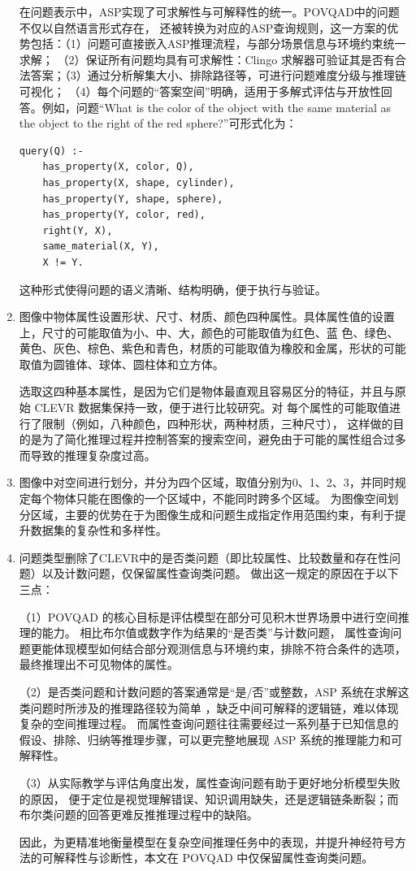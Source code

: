 \begin{enumerate}[nosep]
在问题表示中，ASP实现了可求解性与可解释性的统一。POVQAD中的问题不仅以自然语言形式存在，
还被转换为对应的ASP查询规则，这一方案的优势包括：（1）问题可直接嵌入ASP推理流程，与部分场景信息与环境约束统一求解；
（2）保证所有问题均具有可求解性：Clingo 求解器可验证其是否有合法答案；（3）通过分析解集大小、排除路径等，可进行问题难度分级与推理链可视化；
（4）每个问题的“答案空间”明确，适用于多解式评估与开放性回答。例如，问题“What is the color of the object with the same material as the object to the right of the red sphere?”可形式化为：
\begin{lstlisting}
query(Q) :-
    has_property(X, color, Q),
    has_property(X, shape, cylinder),
    has_property(Y, shape, sphere),
    has_property(Y, color, red),
    right(Y, X),
    same_material(X, Y),
    X != Y.
\end{lstlisting}
这种形式使得问题的语义清晰、结构明确，便于执行与验证。
\item 图像中物体属性设置形状、尺寸、材质、颜色四种属性。具体属性值的设置上，尺寸的可能取值为小、中、大，颜色的可能取值为红色、蓝
色、绿色、黄色、灰色、棕色、紫色和青色，材质的可能取值为橡胶和金属，形状的可能取值为圆锥体、球体、圆柱体和立方体。

选取这四种基本属性，是因为它们是物体最直观且容易区分的特征，并且与原始 CLEVR 数据集保持一致，便于进行比较研究。对
每个属性的可能取值进行了限制（例如，八种颜色，四种形状，两种材质，三种尺寸），
这样做的目的是为了简化推理过程并控制答案的搜索空间，避免由于可能的属性组合过多而导致的推理复杂度过高。
\item 图像中对空间进行划分，并分为四个区域，取值分别为0、1、2、3，并同时规定每个物体只能在图像的一个区域中，不能同时跨多个区域。
为图像空间划分区域，主要的优势在于为图像生成和问题生成指定作用范围约束，有利于提升数据集的复杂性和多样性。
\item 问题类型删除了CLEVR中的是否类问题（即比较属性、比较数量和存在性问题）以及计数问题，仅保留属性查询类问题。
做出这一规定的原因在于以下三点：

（1）POVQAD 的核心目标是评估模型在部分可见积木世界场景中进行空间推理的能力。
相比布尔值或数字作为结果的“是否类”与计数问题，
属性查询问题更能体现模型如何结合部分观测信息与环境约束，排除不符合条件的选项，最终推理出不可见物体的属性。

（2）是否类问题和计数问题的答案通常是“是/否”或整数，ASP 系统在求解这类问题时所涉及的推理路径较为简单
，缺乏中间可解释的逻辑链，难以体现复杂的空间推理过程。
而属性查询问题往往需要经过一系列基于已知信息的假设、排除、归纳等推理步骤，可以更完整地展现 ASP 系统的推理能力和可解释性。

（3）从实际教学与评估角度出发，属性查询问题有助于更好地分析模型失败的原因，
便于定位是视觉理解错误、知识调用缺失，还是逻辑链条断裂；而布尔类问题的回答更难反推推理过程中的缺陷。

因此，为更精准地衡量模型在复杂空间推理任务中的表现，并提升神经符号方法的可解释性与诊断性，本文在 POVQAD 中仅保留属性查询类问题。
\end{enumerate}

